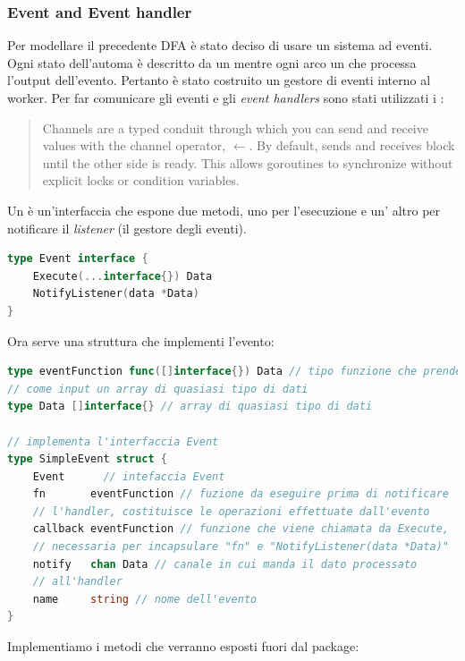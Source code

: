 \documentclass[main.tex]{subfiles}
\begin{document}
\subsubsection{Event and Event handler}
Per modellare il precedente DFA è stato deciso di usare un sistema ad eventi. Ogni stato dell'automa è descritto da un  mentre ogni arco un  che processa l'output dell'evento. Pertanto è stato costruito un gestore di eventi interno al worker.\newline
Per far comunicare gli eventi e gli \emph{event handlers} sono stati utilizzati i :
\begin{quote}
Channels are a typed conduit through which you can send and receive values with the channel operator, \(\leftarrow\).
By default, sends and receives block until the other side is ready. This allows goroutines to synchronize without explicit locks or condition variables.\cite{GoChannels}
\end{quote}

Un  è un'interfaccia che espone due metodi, uno per l'esecuzione e un' altro per notificare il \emph{listener} (il gestore degli eventi).
\begin{lstlisting}[language=go]
type Event interface {
    Execute(...interface{}) Data
    NotifyListener(data *Data)
}
\end{lstlisting}
Ora serve una struttura che implementi l'evento:
\begin{lstlisting}[language=go]
type eventFunction func([]interface{}) Data // tipo funzione che prende 
// come input un array di quasiasi tipo di dati 
type Data []interface{} // array di quasiasi tipo di dati 

// implementa l'interfaccia Event
type SimpleEvent struct {
    Event      // intefaccia Event
    fn       eventFunction // fuzione da eseguire prima di notificare 
    // l'handler, costituisce le operazioni effettuate dall'evento
    callback eventFunction // funzione che viene chiamata da Execute,
    // necessaria per incapsulare "fn" e "NotifyListener(data *Data)"
    notify   chan Data // canale in cui manda il dato processato 
    // all'handler
    name     string // nome dell'evento
}
\end{lstlisting}
Implementiamo i metodi che verranno esposti fuori dal package:
\end{document}
